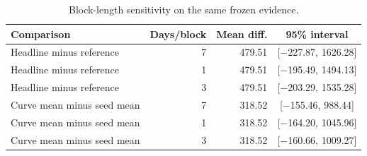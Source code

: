 \begin{table}[!htbp]
\centering\small
\caption{Block-length sensitivity on the same frozen evidence.}\label{tab:bootstrap}
\begin{tabularx}{\linewidth}{@{}Xrrc@{}}
\toprule
Comparison & Days/block & Mean diff. & 95\% interval \\
\midrule
Headline minus reference & 7 & 479.51 & [$-$227.87, 1626.28] \\
Headline minus reference & 1 & 479.51 & [$-$195.49, 1494.13] \\
Headline minus reference & 3 & 479.51 & [$-$203.29, 1535.28] \\
Curve mean minus seed mean & 7 & 318.52 & [$-$155.46, 988.44] \\
Curve mean minus seed mean & 1 & 318.52 & [$-$164.20, 1045.96] \\
Curve mean minus seed mean & 3 & 318.52 & [$-$160.66, 1009.27] \\
\bottomrule
\end{tabularx}
\end{table}
